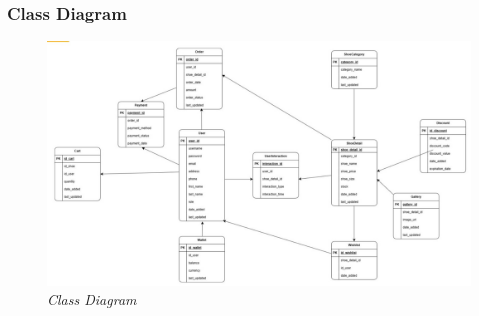 \documentclass[journal,article,submit,pdftex,moreauthors]{Definitions/mdpi}
\begin{document}
\subsubsection{Class Diagram}
\begin{figure}[H]
    \centering
    \includegraphics[width=1.0\textwidth]{images/classdiagram.jpg}
     \captionsetup{justification=centering}
    \caption{\textit{Class Diagram}}
    \label{fig:enter-label}
\end{figure}
\end{document}
